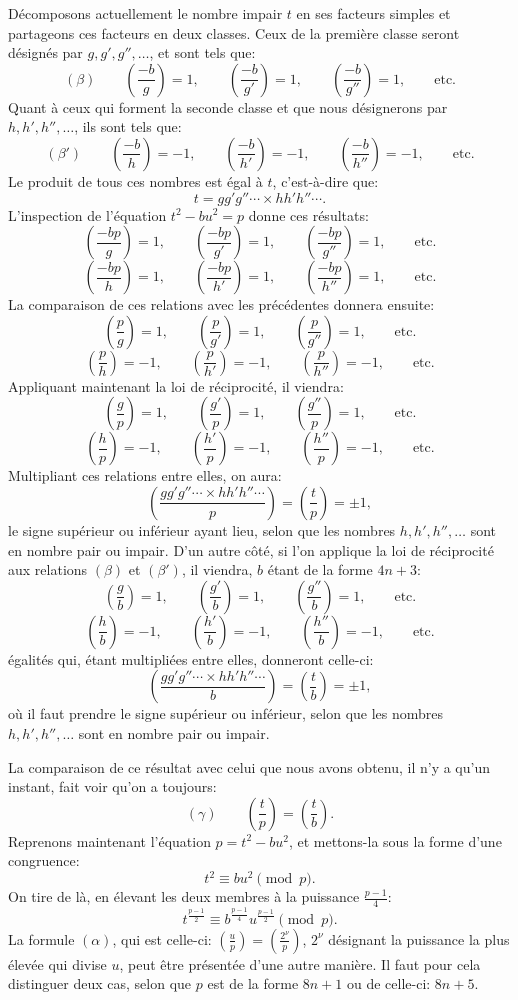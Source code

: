 \documentclass[11pt]{article}
\newcommand{\leg}[2]{\left(\frac{#1}{#2}\right)}
\newcommand{\unitid}[1]{\hypertarget{#1}{}}
\begin{document}
\unitid{dirichlet.v1.p04a.par.019}Décomposons actuellement le nombre impair $t$ en ses facteurs simples et partageons ces facteurs en deux classes. Ceux de la première classe seront désignés par $g,g',g'',\ldots$, et sont tels que:
\[
(\beta)\qquad \leg{-b}{g}=1,
\qquad \leg{-b}{g'}=1,
\qquad \leg{-b}{g''}=1,
\qquad \text{etc.}
\]
Quant à ceux qui forment la seconde classe et que nous désignerons par $h,h',h'',\ldots$, ils sont tels que:
\[
(\beta')\qquad \leg{-b}{h}=-1,
\qquad \leg{-b}{h'}=-1,
\qquad \leg{-b}{h''}=-1,
\qquad \text{etc.}
\]
Le produit de tous ces nombres est égal à $t$, c'est-à-dire que:
\[
 t=gg'g''\cdots\times hh'h''\cdots.
\]
L'inspection de l'équation $t^2-bu^2=p$ donne ces résultats:
\[
\leg{-bp}{g}=1,
\qquad \leg{-bp}{g'}=1,
\qquad \leg{-bp}{g''}=1,
\qquad \text{etc.}
\]
\[
\leg{-bp}{h}=1,
\qquad \leg{-bp}{h'}=1,
\qquad \leg{-bp}{h''}=1,
\qquad \text{etc.}
\]
La comparaison de ces relations avec les précédentes donnera ensuite:
\[
\leg{p}{g}=1,
\qquad \leg{p}{g'}=1,
\qquad \leg{p}{g''}=1,
\qquad \text{etc.}
\]
\[
\leg{p}{h}=-1,
\qquad \leg{p}{h'}=-1,
\qquad \leg{p}{h''}=-1,
\qquad \text{etc.}
\]
Appliquant maintenant la loi de réciprocité, il viendra:
\[
\leg{g}{p}=1,
\qquad \leg{g'}{p}=1,
\qquad \leg{g''}{p}=1,
\qquad \text{etc.}
\]
\[
\leg{h}{p}=-1,
\qquad \leg{h'}{p}=-1,
\qquad \leg{h''}{p}=-1,
\qquad \text{etc.}
\]
Multipliant ces relations entre elles, on aura:
\[
\leg{gg'g''\cdots\times hh'h''\cdots}{p}=\leg{t}{p}=\pm1,
\]
le signe supérieur ou inférieur ayant lieu, selon que les nombres $h,h',h'',\ldots$ sont en nombre pair ou impair. D'un autre côté, si l'on applique la loi de réciprocité aux relations $(\beta)$ et $(\beta')$, il viendra, $b$ étant de la forme $4n+3$:
\[
\leg{g}{b}=1,
\qquad \leg{g'}{b}=1,
\qquad \leg{g''}{b}=1,
\qquad \text{etc.}
\]
\[
\leg{h}{b}=-1,
\qquad \leg{h'}{b}=-1,
\qquad \leg{h''}{b}=-1,
\qquad \text{etc.}
\]
égalités qui, étant multipliées entre elles, donneront celle-ci:
\[
 \leg{gg'g''\cdots\times hh'h''\cdots}{b}=\leg{t}{b}=\pm1,
\]
où il faut prendre le signe supérieur ou inférieur, selon que les nombres $h,h',h'',\ldots$ sont en nombre pair ou impair.

\unitid{dirichlet.v1.p04a.par.020}La comparaison de ce résultat avec celui que nous avons obtenu, il n'y a qu'un instant, fait voir qu'on a toujours:
\[
(\gamma)\qquad \leg{t}{p}=\leg{t}{b}.
\]
Reprenons maintenant l'équation $p=t^2-bu^2$, et mettons-la sous la forme d'une congruence:
\[
 t^2\equiv bu^2\pmod p.
\]
On tire de là, en élevant les deux membres à la puissance $\frac{p-1}{4}$:
\[
 t^{\frac{p-1}{2}}\equiv b^{\frac{p-1}{4}}u^{\frac{p-1}{2}}\pmod p.
\]
La formule $(\alpha)$, qui est celle-ci: $\leg{u}{p}=\leg{2^\nu}{p}$, $2^\nu$ désignant la puissance la plus élevée qui divise $u$, peut être présentée d'une autre manière. Il faut pour cela distinguer deux cas, selon que $p$ est de la forme $8n+1$ ou de celle-ci: $8n+5$.
\end{document}
